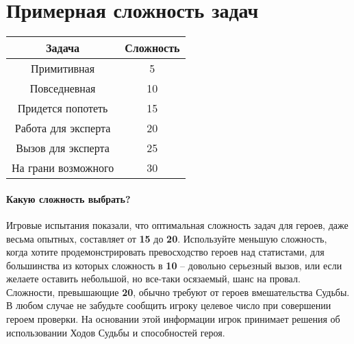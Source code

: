 \section{Примерная сложность задач}
\begin{center}
\begin{tabular}{ |c|c| }
\hline
\textbf{Задача} & \textbf{Сложность} \\ \hline
Примитивная & 5 \\ \hline
Повседневная & 10 \\ \hline
Придется попотеть & 15 \\ \hline
Работа для эксперта & 20 \\ \hline
Вызов для эксперта & 25 \\ \hline
На грани возможного & 30 \\ \hline
\end{tabular}
\end{center}
\paragraph{Какую сложность выбрать?} Игровые испытания показали, что оптимальная сложность задач для героев, даже весьма опытных, составляет от \textbf{15} до \textbf{20}. Используйте меньшую сложность, когда хотите продемонстрировать превосходство героев над статистами, для большинства из которых сложность в \textbf{10} – довольно серьезный вызов, или если желаете оставить небольшой, но все-таки осязаемый, шанс на провал. Сложности, превышающие \textbf{20}, обычно требуют от героев вмешательства Судьбы.
\newline В любом случае не забудьте сообщить игроку целевое число при совершении героем проверки. На основании этой информации игрок принимает решения об использовании Ходов Судьбы и способностей героя.

